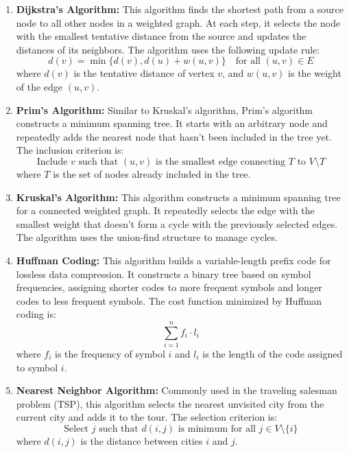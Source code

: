 \documentclass[
]{article}
\begin{document}
    \begin{enumerate}
        \item \textbf{Dijkstra’s Algorithm:} This algorithm finds the shortest path from a source node to all other nodes in a weighted graph. At each step, it selects the node with the smallest tentative distance from the source and updates the distances of its neighbors. The algorithm uses the following update rule:
        \[
            d(v) = \min \{ d(v), d(u) + w(u, v) \} \quad \text{for all } (u, v) \in E
        \]
        where \(d(v)\) is the tentative distance of vertex \(v\), and \(w(u, v)\) is the weight of the edge \((u, v)\).

        \item \textbf{Prim’s Algorithm:} Similar to Kruskal’s algorithm, Prim’s algorithm constructs a minimum spanning tree. It starts with an arbitrary node and repeatedly adds the nearest node that hasn’t been included in the tree yet. The inclusion criterion is:
        \[
            \text{Include } v \text{ such that } (u, v) \text{ is the smallest edge connecting } T \text{ to } V \setminus T
        \]
        where \(T\) is the set of nodes already included in the tree.

        \item \textbf{Kruskal’s Algorithm:} This algorithm constructs a minimum spanning tree for a connected weighted graph. It repeatedly selects the edge with the smallest weight that doesn’t form a cycle with the previously selected edges. The algorithm uses the union-find structure to manage cycles.

        \item \textbf{Huffman Coding:} This algorithm builds a variable-length prefix code for lossless data compression. It constructs a binary tree based on symbol frequencies, assigning shorter codes to more frequent symbols and longer codes to less frequent symbols. The cost function minimized by Huffman coding is:
        \[
            \sum_{i=1}^n f_i \cdot l_i
        \]
        where \(f_i\) is the frequency of symbol \(i\) and \(l_i\) is the length of the code assigned to symbol \(i\).

        \item \textbf{Nearest Neighbor Algorithm:} Commonly used in the traveling salesman problem (TSP), this algorithm selects the nearest unvisited city from the current city and adds it to the tour. The selection criterion is:
        \[
            \text{Select } j \text{ such that } d(i, j) \text{ is minimum for all } j \in V \setminus \{i\}
        \]
        where \(d(i, j)\) is the distance between cities \(i\) and \(j\).
    \end{enumerate}
\end{document}
